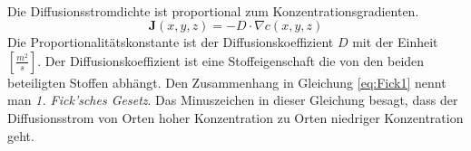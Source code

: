\documentclass[11pt,a4paper]{article}
\numberwithin{equation}{section}
\numberwithin{figure}{section}
\begin{document}
\\
\begin{addmargin}[25pt]{0pt}
Die Diffusionsstromdichte ist proportional zum Konzentrationsgradienten. 
\begin{equation}\label{eq:Fick1}
    \mathbf{J}(x,y,z) = -D\cdot \nabla c(x,y,z) 
\end{equation}
Die Proportionalitätskonstante ist der Diffusionskoeffizient $D$ mit der Einheit $\left[ \frac{\si{m}^2}{\si{s}}\right]$. Der Diffusionskoeffizient ist eine Stoffeigenschaft die von den beiden beteiligten Stoffen abhängt. Den Zusammenhang in Gleichung \ref{eq:Fick1} nennt man \textit{1. Fick'sches Gesetz}. Das Minuszeichen in dieser Gleichung besagt, dass der Diffusionsstrom von Orten hoher Konzentration zu Orten niedriger Konzentration geht.\\
\end{addmargin} 
\end{document}

